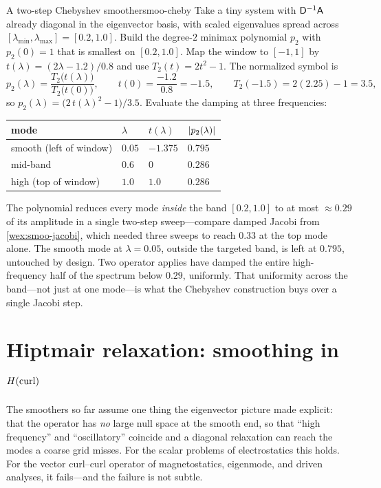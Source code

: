 \begin{workedexample}{A two-step Chebyshev smoother}{smoo-cheby}
Take a tiny system with $\mathsf{D}^{-1}\mathsf{A}$ already diagonal in the eigenvector
basis, with scaled eigenvalues spread across $[\lambda_{\min},\lambda_{\max}]=[0.2,1.0]$.
Build the degree-$2$ minimax polynomial $p_2$ with $p_2(0)=1$ that is smallest on
$[0.2,1.0]$. Map the window to $[-1,1]$ by $t(\lambda)=(2\lambda-1.2)/0.8$ and use
$T_2(t)=2t^2-1$. The normalized symbol is
\[
  p_2(\lambda) = \frac{T_2\bigl(t(\lambda)\bigr)}{T_2\bigl(t(0)\bigr)},
  \qquad t(0) = \frac{-1.2}{0.8} = -1.5,
  \qquad T_2(-1.5) = 2(2.25)-1 = 3.5,
\]
so $p_2(\lambda) = \bigl(2\,t(\lambda)^2 - 1\bigr)/3.5$. Evaluate the damping at three
frequencies:
\begin{center}
\setlength{\tabcolsep}{10pt}\renewcommand{\arraystretch}{1.15}
\begin{tabular}{@{}llll@{}}
\toprule
mode & $\lambda$ & $t(\lambda)$ & $\lvert p_2(\lambda)\rvert$ \\
\midrule
smooth (left of window)   & $0.05$ & $-1.375$ & $0.795$ \\
mid-band                  & $0.6$  & $0$      & $0.286$ \\
high (top of window)      & $1.0$  & $1.0$    & $0.286$ \\
\bottomrule
\end{tabular}
\end{center}
The polynomial reduces every mode \emph{inside} the band $[0.2,1.0]$ to at most
$\approx 0.29$ of its amplitude in a single two-step sweep---compare damped Jacobi
from \cref{wex:smoo-jacobi}, which needed three sweeps to reach $0.33$ at the top
mode alone. The smooth mode at $\lambda=0.05$, outside the targeted band, is left at
$0.795$, untouched by design. Two operator applies have damped the entire
high-frequency half of the spectrum below $0.29$, uniformly. That uniformity across
the band---not just at one mode---is what the Chebyshev construction buys over a
single Jacobi step.
\end{workedexample}

\section{Hiptmair relaxation: smoothing in \texorpdfstring{$H(\mathrm{curl})$}{H(curl)}}
\label{sec:smoo-hiptmair}

The smoothers so far assume one thing the eigenvector picture made explicit: that
the operator has \emph{no} large null space at the smooth end, so that ``high
frequency'' and ``oscillatory'' coincide and a diagonal relaxation can reach the
modes a coarse grid misses. For the scalar problems of electrostatics this holds.
For the vector curl--curl operator of magnetostatics, eigenmode, and driven
analyses, it fails---and the failure is not subtle.

